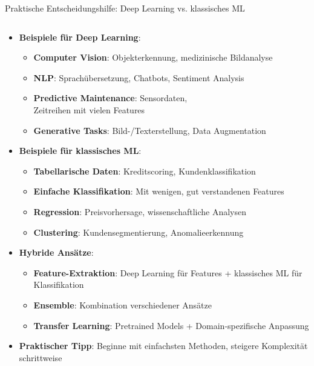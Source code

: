 \documentclass[aspectratio=1610, xcolor=dvipsnames, 9pt]{beamer}
\begin{document}
\begin{frame}{Praktische Entscheidungshilfe: Deep Learning vs. klassisches ML}
  \begin{columns}
    \begin{column}{1\textwidth}
      \begin{itemize}
        \item \textbf{Beispiele für Deep Learning}:
        \begin{itemize}
          \item \textbf{Computer Vision}: Objekterkennung, medizinische Bildanalyse
          \item \textbf{NLP}: Sprachübersetzung, Chatbots, Sentiment Analysis
          \item \textbf{Predictive Maintenance}: Sensordaten, \\
            Zeitreihen mit vielen Features
          \item \textbf{Generative Tasks}: Bild-/Texterstellung, Data Augmentation
        \end{itemize}
        \item \textbf{Beispiele für klassisches ML}:
        \begin{itemize}
          \item \textbf{Tabellarische Daten}: Kreditscoring, Kundenklassifikation
          \item \textbf{Einfache Klassifikation}: Mit wenigen, gut verstandenen Features
          \item \textbf{Regression}: Preisvorhersage, wissenschaftliche Analysen
          \item \textbf{Clustering}: Kundensegmentierung, Anomalieerkennung
        \end{itemize}
        \item \textbf{Hybride Ansätze}:
        \begin{itemize}
          \item \textbf{Feature-Extraktion}: Deep Learning für Features + klassisches ML für Klassifikation
          \item \textbf{Ensemble}: Kombination verschiedener Ansätze
          \item \textbf{Transfer Learning}: Pretrained Models + Domain-spezifische Anpassung
        \end{itemize}
        \item \textbf{Praktischer Tipp}: Beginne mit einfachsten Methoden, steigere Komplexität schrittweise
      \end{itemize}
    \end{column}
  \end{columns}
\end{frame}
\end{document}
